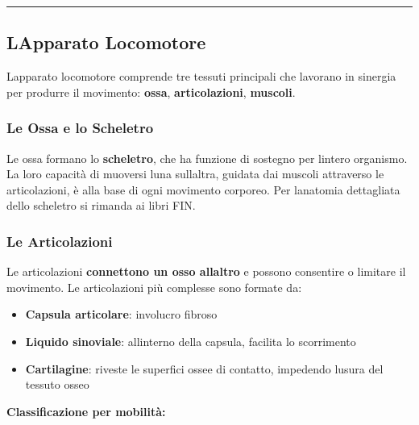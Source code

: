 \documentclass[a4paper,11pt]{article}
\providecommand{\tightlist}{%
  \setlength{\itemsep}{0pt}\setlength{\parskip}{0pt}}
\begin{document}
\begin{center}\rule{0.5\linewidth}{0.5pt}\end{center}

\subsection{L\textquotesingle Apparato
      Locomotore}\label{lapparato-locomotore}

L\textquotesingle apparato locomotore comprende tre tessuti principali
che lavorano in sinergia per produrre il movimento: \textbf{ossa},
\textbf{articolazioni}, \textbf{muscoli}.

\subsubsection{Le Ossa e lo Scheletro}\label{le-ossa-e-lo-scheletro}

Le ossa formano lo \textbf{scheletro}, che ha funzione di sostegno per
l\textquotesingle intero organismo. La loro capacità di muoversi
l\textquotesingle una sull\textquotesingle altra, guidata dai muscoli
attraverso le articolazioni, è alla base di ogni movimento corporeo. Per
l\textquotesingle anatomia dettagliata dello scheletro si rimanda ai
libri FIN.

\subsubsection{Le Articolazioni}\label{le-articolazioni}

Le articolazioni \textbf{connettono un osso all\textquotesingle altro} e
possono consentire o limitare il movimento. Le articolazioni più
complesse sono formate da:

\begin{itemize}
      \tightlist
      \item
            \textbf{Capsula articolare}: involucro fibroso
      \item
            \textbf{Liquido sinoviale}: all\textquotesingle interno della capsula,
            facilita lo scorrimento
      \item
            \textbf{Cartilagine}: riveste le superfici ossee di contatto,
            impedendo l\textquotesingle usura del tessuto osseo
\end{itemize}

\textbf{Classificazione per mobilità:}
\end{document}
